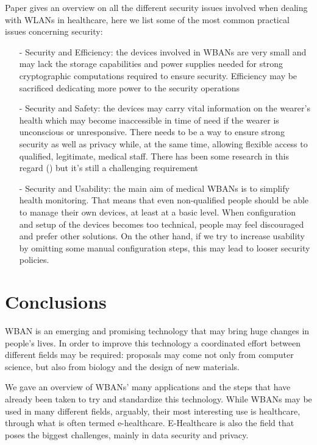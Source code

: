 \documentclass[conference]{IEEEtran}
\begin{document}
Paper \cite{li2010data} gives an overview on all the different security issues involved when dealing with WLANs in healthcare, here we list some of the most common practical issues concerning security:
	\begin{itemize}
		\item[-] Security and Efficiency: the devices involved in WBANs are very small and may lack the storage capabilities and power supplies needed for strong cryptographic computations required to ensure security. Efficiency may be sacrificed dedicating more power to the security operations
		\item[-]  Security and Safety: the devices may carry vital information on the wearer’s health which may become inaccessible in time of need if the wearer is unconscious or unresponsive. There needs to be a way to ensure strong security as well as privacy while, at the same time, allowing flexible access to qualified, legitimate, medical staff. There has been some research in this regard (\cite{li2010data}) but it's still a challenging requirement
		\item[-] Security and Usability: the main aim of medical WBANs is to simplify health monitoring. That means that even non-qualified people should be able to manage their own devices, at least at a basic level. When configuration and setup of the devices becomes too technical, people may feel discouraged and prefer other solutions. On the other hand, if we try to increase usability by omitting some manual configuration steps, this may lead to looser security policies.
	\end{itemize}


\section{Conclusions}
WBAN is an emerging and promising technology that may bring huge changes in people’s lives. In order to improve this technology a coordinated effort between different fields may be required: proposals may come not only from computer science, but also from biology and the design of new materials. 

We gave an overview of WBANs' many applications and the steps that have already been taken to try and standardize this technology. While WBANs may be used in many different fields, arguably, their most interesting use is healthcare, through what is often termed e-healthcare. E-Healthcare is also the field that poses the biggest challenges, mainly in data security and privacy.
\end{document}
